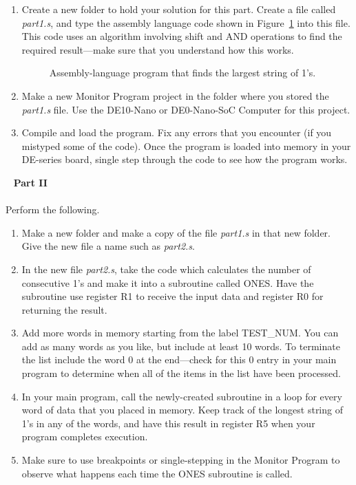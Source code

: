 \documentclass[epsfig,10pt,fullpage]{article}
\begin{document}
\begin{enumerate}
\item Create a new folder to hold your solution for this part. Create a
file called {\it part1.s}, and type the assembly language code shown in 
Figure~\ref{fig:code} into this
file. This code uses an algorithm involving shift and AND operations to find the required 
result---make sure that you understand how this works.

\begin{figure}[H]
\begin{center}
\begin{minipage}[t]{16.5 cm}

\end{minipage}
\end{center}
\caption{Assembly-language program that finds the largest string of 1's.}
\label{fig:code}
\end{figure}

\item
Make a new Monitor Program project in the folder where you stored the {\it part1.s}
file. Use the DE10-Nano or DE0-Nano-SoC Computer for this project.
\item
Compile and load the program. Fix any errors that you encounter (if you mistyped some of
the code). Once the program is loaded into memory in your DE-series board, single step
through the code to see how the program works.
\end{enumerate}
\
\noindent
{\bf Part II}
~\\
~\\
\noindent
Perform the following.
\begin{enumerate}
\item Make a new folder and make a copy of the file {\it part1.s} in that new folder. Give
the new file a name such as {\it part2.s}.
\item In the new file {\it part2.s}, take the code which calculates the 
number of consecutive 1's and make it into a subroutine called ONES. Have the subroutine use 
register R1 to receive the input data and register R0 for returning the result.
\item Add more words in memory starting from the label TEST\_NUM. You can add as many
words as you like, but include at least 10 words. To terminate the list include the word 0
at the end---check for this 0 entry in your main program to determine when all of the
items in the list have been processed.
\item In your main program, call the newly-created subroutine in a loop for every word of 
data that you placed in memory. Keep track of the longest string of 1's in any of the words, 
and have this result in register R5 when your program completes execution. 
\item Make sure to use breakpoints or single-stepping in the Monitor Program to observe what 
happens each time the ONES subroutine is called.
\end{enumerate}
\end{document}
